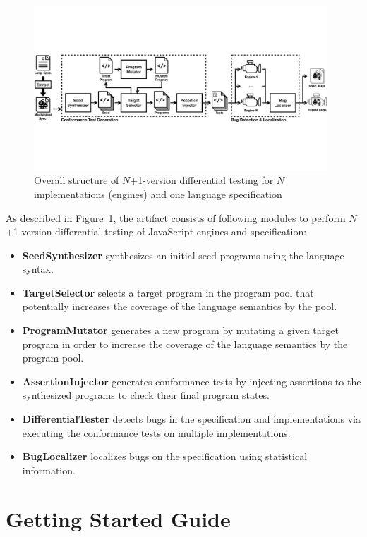 \documentclass[conference]{IEEEtran}
\begin{document}
\begin{figure}
  \includegraphics[width=0.98\textwidth]{img/overall.pdf}
  \caption{Overall structure of $N$+1-version differential testing for $N$
    implementations (engines) and one language specification}
  \label{fig:overall}
\end{figure}

As described in Figure~\ref{fig:overall}, the artifact consists of following
modules to perform $N$+1-version differential testing of JavaScript engines and
specification:
\begin{itemize}
  \item \textbf{SeedSynthesizer} synthesizes an initial seed programs using
    the language syntax.
  \item \textbf{TargetSelector} selects a target program in the program
    pool that potentially increases the coverage of the language semantics by
    the pool.
  \item \textbf{ProgramMutator} generates a new program by mutating a given
    target program in order to increase the coverage of the language semantics
    by the program pool.
  \item \textbf{AssertionInjector} generates conformance tests by injecting
    assertions to the synthesized programs to check their final program states.
  \item \textbf{DifferentialTester} detects bugs in the specification and
    implementations via executing the conformance tests on multiple
    implementations.
  \item \textbf{BugLocalizer} localizes bugs on the specification using
    statistical information.
\end{itemize}


\section{Getting Started Guide}
\end{document}
